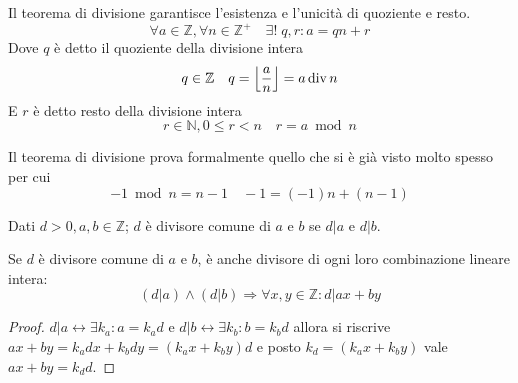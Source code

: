 \begin{theorem}[Divisione]
    \label{teo:divisione}
    Il teorema di divisione garantisce l'esistenza e l'unicità di quoziente e resto.
    \begin{equation*}
        \forall a \in \mathbb{Z}, \forall n \in \mathbb{Z}^+
        \quad
        \exists !
        \;
        q, r :
        a = qn + r
    \end{equation*}
    Dove $q$ è detto il quoziente della divisione intera
    \begin{equation*}
        q \in \mathbb{Z}
        \quad
        q = \left\lfloor 
            \frac{a}{n}
        \right\rfloor
        = a \operatorname*{div} n
    \end{equation*}
    E $r$ è detto resto della divisione intera
    \begin{equation*}
        r \in \mathbb{N}, 0 \leq r < n
        \quad
        r = a \bmod n
    \end{equation*}
\end{theorem}
\begin{corollario}
    Il teorema di divisione prova formalmente quello che si è già visto molto spesso per cui 
    \begin{equation*}
        -1 \bmod n = n-1
        \quad
        -1 = \left( -1 \right) n + \left( n-1 \right)
    \end{equation*}
\end{corollario}
\begin{definition} 
    \label{def:divisoricomuni}
    Dati $d > 0, a, b \in \mathbb{Z}$; $d$ è divisore comune di $a$ e $b$ se 
    $d|a$
    e
    $d|b$.
\end{definition}
\begin{proposizione}
    \label{prop:divisore_cli}
    Se $d$ è divisore comune di $a$ e $b$, è anche divisore di ogni loro combinazione lineare intera:
    \begin{equation*}
        \left( 
            d|a
        \right)
        \wedge
        \left( 
            d|b
        \right)
        \Rightarrow
        \forall x, y \in \mathbb{Z} :
        d | ax + by
    \end{equation*}
    \begin{proof}
        $d | a \leftrightarrow \exists k_a : a = k_a d$ 
        e
        $d | b \leftrightarrow \exists k_b : b = k_b d$ 
        allora si riscrive 
        $
        ax + by = k_a d x + k_b d y
        =
        \left( k_a x + k_b y \right) d
        $ e posto $
        k_d = 
        \left( k_a x + k_b y \right)
        $ vale $
        ax + by = k_d d
        $.
    \end{proof}
\end{proposizione}
